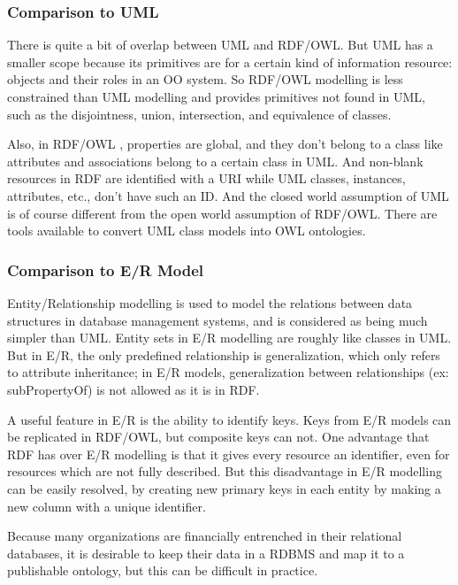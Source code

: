 \documentclass[10pt,journal,compsoc]{IEEEtran}
\begin{document}
\subsubsection{Comparison to UML}
There is quite a bit of overlap between UML and RDF/OWL.  But UML has a smaller scope because its primitives are for a certain kind of information resource: objects and their roles in an OO system.  So RDF/OWL modelling is less constrained than UML modelling and provides primitives not found in UML, such as the disjointness, union, intersection, and equivalence of classes.

Also, in RDF/OWL , properties are global, and they don’t belong to a class like attributes and associations belong to a certain class in UML.  And non-blank resources in RDF are identified with a URI while UML classes, instances, attributes, etc.,  don’t have such an ID.  And the closed world assumption of UML is of course different from the open world assumption of RDF/OWL.  There are tools available to convert UML class models into OWL ontologies.

\subsubsection{Comparison to E/R Model}
Entity/Relationship modelling is used to model the relations between data structures in database management systems, and is considered as being much simpler than UML.  Entity sets in E/R modelling are roughly like classes in UML.  But in E/R, the only predefined relationship is generalization, which only refers to attribute inheritance; in E/R models, generalization between relationships (ex: subPropertyOf) is not allowed as it is in RDF.  




A useful feature in E/R is the ability to identify keys.  Keys from E/R models can be replicated in RDF/OWL, but composite keys can not.  One advantage that RDF has over E/R modelling is that it gives every resource an identifier, even for resources which are not fully described.  But this disadvantage in E/R modelling can be easily resolved, by creating new primary keys in each entity by making a new column with a unique identifier.

Because many organizations are financially entrenched in their relational databases, it is desirable to keep their data in a RDBMS and map it to a publishable ontology, but this can be difficult in practice.  
\end{document}
